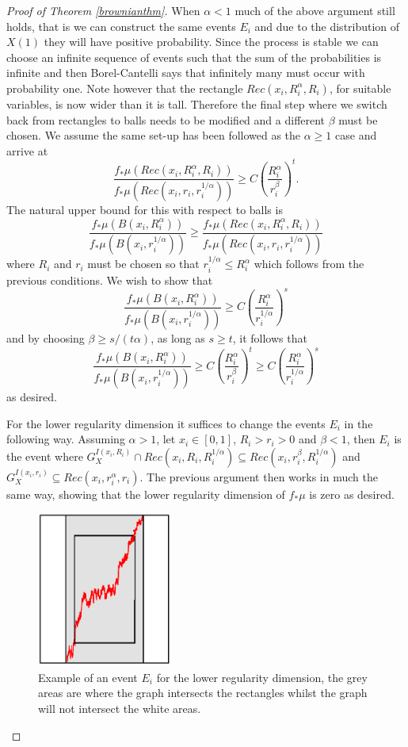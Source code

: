 \begin{proof}[Proof of Theorem \ref{brownianthm}]
When $\alpha < 1$ much of the above argument still holds, that is we can construct the same events $E_i$ and due to the distribution of $X(1)$ they will have positive probability. Since the process is stable we can choose an infinite sequence of events such that the sum of the probabilities is infinite and then Borel-Cantelli says that infinitely many must occur with probability one. Note however that the rectangle $Rec(x_i, R_i^{\alpha}, R_i)$, for suitable variables, is now wider than it is tall. Therefore the final step where we switch back from rectangles to balls needs to be modified and a different $\beta$ must be chosen. We assume the same set-up has been followed as the $\alpha \ge 1$ case and arrive at
\[
\frac{f_*\mu(Rec(x_i,R_i^{\alpha}, R_i))}{f_*\mu(Rec(x_i,r_i, r_i^{1/\alpha}))} \ge C \left( \frac{R_i^{\alpha}}{r_i^{\beta}} \right) ^t.
\]
The natural upper bound for this with respect to balls is 
\[
\frac{f_*\mu(B(x_i, R_i^{\alpha}))}{f_*\mu(B(x_i,r_i^{1/\alpha}))} \ge \frac{f_*\mu(Rec(x_i,R_i^{\alpha}, R_i))}{f_*\mu(Rec(x_i,r_i, r_i^{1/\alpha}))}
\]
where $R_i$ and $r_i$ must be chosen so that $r_i^{1/\alpha}  \le R_i^{\alpha}$ which follows from the previous conditions. We wish to show that 
\[
\frac{f_*\mu(B(x_i, R_i^{\alpha}))}{f_*\mu(B(x_i,r_i^{1/\alpha}))} \ge C \left( \frac{R_i^{\alpha}}{r_i^{1/\alpha}} \right)^s
\]
and by choosing $\beta \ge s/ (t\alpha)$, as long as $s \ge t$, it follows that
\[
\frac{f_*\mu(B(x_i, R_i^{\alpha}))}{f_*\mu(B(x_i,r_i^{1/\alpha}))} \ge C \left( \frac{R_i^{\alpha}}{r_i^{\beta}} \right) ^t \ge C \left(\frac{R_i^{\alpha}}{r_i^{1/\alpha}}\right)^s
\]
as desired.

For the lower regularity dimension it suffices to change the events $E_i$ in the following way. Assuming $\alpha>1$, let $x_i \in [0,1]$, $R_i > r_i > 0$ and $\beta < 1$, then $E_i$ is the event where $G_X^{I(x_i, R_i)} \cap Rec(x_i,R_i,R_i^{1/\alpha}) \subseteq Rec(x_i, r_i^{\beta}, R_i^{1/\alpha})$ and $G_X^{I(x_i, r_i)} \subseteq Rec(x_i, r_i^{\alpha}, r_i)$. The previous argument then works in much the same way, showing that the lower regularity dimension of $f_*\mu$ is zero as desired.

\begin{figure}[htbp]
	\centering
	\includegraphics[width=0.4\textwidth]{pics/ch-brownian/rectangles.png}
	\caption{Example of an event $E_i$ for the lower regularity dimension, the grey areas are where the graph intersects the rectangles whilst the graph will not intersect the white areas.}
	\label{brownian_event_lower}
\end{figure}


\end{proof}



